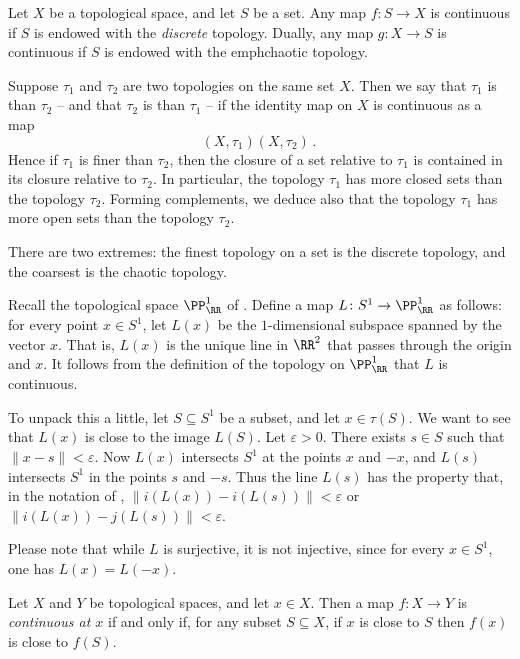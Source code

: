 \begin{exm}
	Let $X$ be a topological space, and let $S$ be a set.
	Any map $f \colon S \to X$ is continuous if $S$ is endowed with the \emph{discrete} topology.
	Dually, any map $ g \colon X \to S $ is continuous if $S$ is endowed with the emph{chaotic} topology.
\end{exm}

\begin{dfn}
	Suppose $\tau_1$ and $\tau_2$ are two topologies on the same set $X$.
	Then we say that $\tau_1$ is  than $\tau_2$ -- and that $\tau_2$ is  than $\tau_1$ -- if the identity map on $X$ is continuous as a map
\[
	(X,\tau_1) (X,\tau_2) \period
\]
	Hence if $\tau_1$ is finer than $\tau_2$, then the closure of a set relative to $\tau_1$ is contained in its closure relative to $\tau_2$.
	In particular, the topology $\tau_1$ has more closed sets than the topology $\tau_2$.
	Forming complements, we deduce also that the topology $\tau_1$ has more open sets than the topology $\tau_2$.

	There are two extremes: the finest topology on a set is the discrete topology, and
	the coarsest is the chaotic topology.
\end{dfn}

\begin{exm}
	Recall the topological space $\PP^1_{\RR}$ of .
	Define a map $ L \colon S^1 \to \PP^1_{\RR}$ as follows: for every point $x \in S^1$, let $L(x)$ be the $1$-dimensional subspace spanned by the vector $x$.
	That is, $L(x)$ is the unique line in $\RR^2$ that passes through the origin and $x$.
	It follows from the definition of the topology on $\PP^1_{\RR}$ that $L$ is continuous.

	To unpack this a little, let $S \subseteq S^1$ be a subset, and let $x \in \tau(S)$.
	We want to see that $L(x)$ is close to the image $L(S)$.
	Let $\varepsilon>0$.
	There exists $ s \in S$ such that $\|x-s\| < \varepsilon$.
	Now $L(x)$ intersects $S^1$ at the points $x$ and $-x$, and $L(s)$ intersects $S^1$ in the points $s$ and $-s$.
	Thus the line $L(s)$ has the property that, in the notation of , $\|i(L(x))-i(L(s))\| < \varepsilon$ or $\|i(L(x))-j(L(s))\| < \varepsilon$.

	Please note that while $L$ is surjective, it is not injective, since for every $x \in S^1$, one has $L(x) = L(-x)$.
\end{exm}

\begin{dfn}
	Let $X$ and $Y$ be topological spaces, and let $x \in X$.
	Then a map $ f \colon X \to Y $ is \emph{continuous at $x$} if and only if, for any subset $S \subseteq X$, if $x $ is close to $S$ then $f(x)$ is close to $f(S)$.
\end{dfn}

